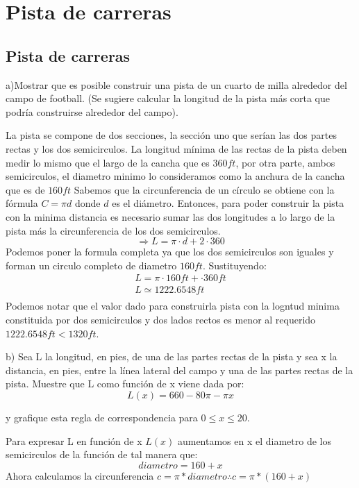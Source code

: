 \chapter*{Pista de carreras}
\section*{Pista de carreras}
a)Mostrar que es posible construir una pista de un cuarto de milla alrededor del
campo de football. (Se sugiere calcular la longitud de la pista más corta que podría
construirse alrededor del campo).

\vspace{0.1cm}

La pista se compone de dos secciones, la sección uno que serían las dos partes rectas y los dos semicirculos. La longitud mínima de las rectas de la pista deben medir lo mismo que el largo de la cancha que es $360ft$, por otra parte, ambos semicirculos, el diametro minimo lo consideramos como la anchura de la cancha que es de $160ft$
Sabemos que la circunferencia de un círculo se obtiene con la fórmula $C=\pi d$ donde $d$ es el diámetro.
Entonces, para poder construir la pista con la minima distancia es necesario sumar las dos longitudes a lo largo de la pista más la circunferencia de los dos semicirculos.
$$\Rightarrow L=\pi \cdot d + 2\cdot 360$$
Podemos poner la formula completa ya que los dos semicirculos son iguales y forman un circulo completo de diametro $160ft$.
Sustituyendo: 
\begin{gather*}
    L=\pi\cdot160ft+\cdot360ft\\
    L\simeq 1222.6548ft\\
\end{gather*}
Podemos notar que el valor dado para construirla pista con la logntud minima constituida por dos semicirculos y dos lados rectos es menor al requerido $1222.6548ft<1320ft$.
\vspace{0.2cm}

b) Sea L la longitud, en pies, de una de las partes rectas de la pista y sea x la distancia, en pies, entre la línea lateral del campo y una de las partes rectas de la pista. Muestre que L como función de x viene dada por:
$$L(x) = 660 - 80 \pi - \pi x$$

y grafique esta regla de correspondencia para $0 \leq x \leq 20$.
\vspace{0.2cm}

Para expresar L en función de x $L(x)$ aumentamos en x el diametro de los semicirculos de la función de tal manera que: $$diametro=160 + x$$
Ahora calculamos la circunferencia  $c=\pi*diametro\therefore c=\pi*(160+x)$

